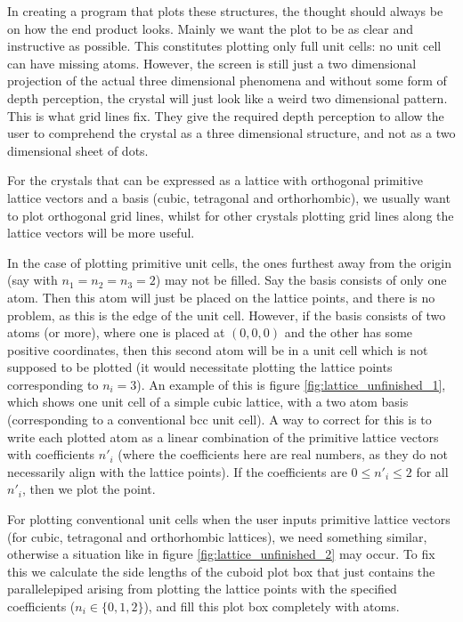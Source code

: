 \documentclass[main.tex]{subfiles}
\begin{document}
	In creating a program that plots these structures, the thought should always be on how the end product looks. Mainly we want the plot to be as clear and instructive as possible. This constitutes plotting only full unit cells: no unit cell can have missing atoms. However, the screen is still just a two dimensional projection of the actual three dimensional phenomena and without some form of depth perception, the crystal will just look like a weird two dimensional pattern. This is what grid lines fix. They give the required depth perception to allow the user to comprehend the crystal as a three dimensional structure, and not as a two dimensional sheet of dots. 
	
	For the crystals that can be expressed as a lattice with orthogonal primitive lattice vectors and a basis (cubic, tetragonal and orthorhombic), we usually want to plot orthogonal grid lines, whilst for other crystals plotting grid lines along the lattice vectors will be more useful.
	
	In the case of plotting primitive unit cells, the ones furthest away from the origin (say with $ n_1 = n_2 = n_3 = 2 $) may not be filled. Say the basis consists of only one atom. Then this atom will just be placed on the lattice points, and there is no problem, as this is the edge of the unit cell. However, if the basis consists of two atoms (or more), where one is placed at $ (0,0,0) $ and the other has some positive coordinates, then this second atom will be in a unit cell which is not supposed to be plotted (it would necessitate plotting the lattice points corresponding to $ n_i = 3 $). An example of this is figure \ref{fig:lattice_unfinished_1}, which shows one unit cell of a simple cubic lattice, with a two atom basis (corresponding to a conventional bcc unit cell). A way to correct for this is to write each plotted atom as a linear combination of the primitive lattice vectors with coefficients $ n'_i $ (where the coefficients here are real numbers, as they do not necessarily align with the lattice points). If the coefficients are $ 0 \leq n'_i \leq 2 $ for all $ n'_i $, then we plot the point.
	
	For plotting conventional unit cells when the user inputs primitive lattice vectors (for cubic, tetragonal and orthorhombic lattices), we need something similar, otherwise a situation like in figure \ref{fig:lattice_unfinished_2} may occur. To fix this we calculate the side lengths of the cuboid plot box that just contains the parallelepiped arising from plotting the lattice points with the specified coefficients ($ n_i \in \{0, 1, 2\}$), and fill this plot box completely with atoms.
	
\end{document}
